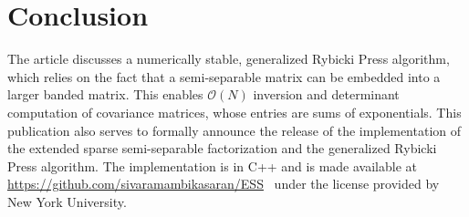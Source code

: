 \documentclass[final,leqno]{siamltex}
\begin{document}
\section{Conclusion}
The article discusses a numerically stable, generalized Rybicki Press algorithm, which relies on the fact that a semi-separable matrix can be embedded into a larger banded matrix. This enables $\mathcal{O}(N)$ inversion and determinant computation of covariance matrices, whose entries are sums of exponentials. This publication also serves to formally announce the release of the implementation of the extended sparse semi-separable factorization and the generalized Rybicki Press algorithm. The implementation is in C++ and is made available at \url{https://github.com/sivaramambikasaran/ESS}~\cite{ambikasaran2014ESS} under the license provided by New York University.

\FloatBarrier


\newpage
% 
% 
\end{document}
